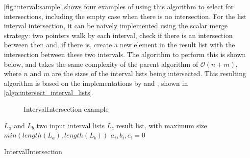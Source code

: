 \autoref{fig:interval:sample} shows four examples of using this algorithm to select for intersections, including the empty case when there is no intersection.
For the list interval intersection, it can be naively implemented using the scalar merge strategy: two pointers walk by each interval, check if there is an intersection between then and, if there is, create a new element in the result list with the intersection between these two intervals.
The algorithm to perform this is shown below, and takes the same complexity of the parent algorithm of $\mathcal{O}(n + m)$, where $n$ and $m$ are the sizes of the interval lists being intersected.
This resulting algorithm is based on the implementations by  and , shown in \autoref{algo:intersect_interval_lists}.

\begin{figure}[!htb]
  \caption{IntervalIntersection example}\label{fig:interval:sample}
  \vspace{6mm}
  \begin{center}
  \end{center}
  \vspace{2mm}
\end{figure}

\begin{algorithm}[H]
\SetAlgoLined
{}
 $L_a$ and $L_b$ two input interval lists\;
 $L_c$ result list, with maximum size $min(length(L_a), length(L_b))$\;
 $a_i, b_i, c_i = 0$\;
 \;
 \caption{IntervalIntersection}\label{algo:intersect_interval_lists}
\end{algorithm}

